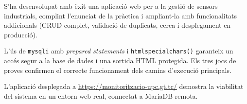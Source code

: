 \documentclass[12pt, a4paper]{article}
\begin{document}
S'ha desenvolupat amb èxit una aplicació web per a la gestió de sensors industrials, complint l'enunciat de la pràctica i ampliant-la amb funcionalitats addicionals (CRUD complet, validació de duplicats, cerca i desplegament en producció).

L'ús de \texttt{mysqli} amb \textit{prepared statements} i \texttt{htmlspecialchars()} garanteix un accés segur a la base de dades i una sortida HTML protegida. Els tres jocs de proves confirmen el correcte funcionament dels camins d'execució principals.

L'aplicació desplegada a \url{https://monitoritzacio-upc.gt.tc/} demostra la viabilitat del sistema en un entorn web real, connectat a MariaDB remota.
\end{document}
